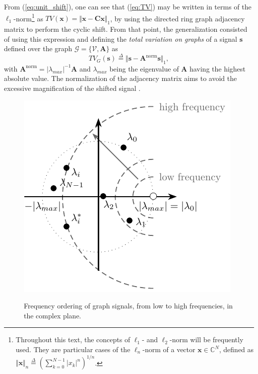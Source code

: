 From (\ref{eq:unit_shift}), one can see that (\ref{eq:TV}) may be written in terms of the $ \ell_1 $-norm\footnote{Throughout this text, the concepts of $ \ell_1 $- and $ \ell_2 $-norm will be frequently used. They are particular cases of the $ \ell_n $-norm of a vector $ \mathbf{x} \in \mathbb{C}^{N} $, defined as $ \Vert \mathbf{x}\Vert_n \overset{\Delta}{=} \left(\sum_{k=0}^{N-1} |x_k|^n\right)^{1/n} $.}
as $ TV(\mathbf{x}) = \Vert \mathbf{x} - \mathbf{C x}\Vert_1 $, by using the directed ring graph adjacency matrix to perform the cyclic shift. From that point, the generalization consisted of using this expression and defining the \emph{total variation on graphs} of a signal $ \mathbf{s} $ defined over the graph $ \mathcal{G} = \{\mathcal{V}, \mathbf{A}\} $ as
\begin{equation}
\label{eq:tv_graphs}
TV_G(\mathbf{s}) \overset{\Delta}{=} \Vert \mathbf{s} - \mathbf{A}^{\text{norm}} \mathbf{s}\Vert_1,
\end{equation}
with $ \mathbf{A}^{\text{norm}} = |\lambda_{max}|^{-1}\mathbf{A} $ and $ \lambda_{max} $ being the eigenvalue of $ \mathbf{A} $ having the highest absolute value. The normalization of the adjacency matrix aims to avoid the excessive magnification of the shifted signal \cite{sandryhaila2014frequency}.

\begin{figure}
	\centering
    \caption{Frequency ordering of graph signals, from low to high frequencies, in the complex plane.}
	\includegraphics[width=0.45\linewidth]{Figures/graph_frequency_EN.pdf}
	\label{fig:ordem_freq}
\end{figure}

